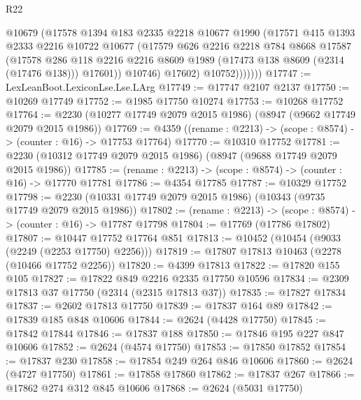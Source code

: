 \begin{lexlean}{R22}
\begin{coremodule}
                  @10679
                  (@17578
                    @1394
                    @183
                    @2335
                    @2218
                    @10677
                    @1990
                    (@17571
                      @415
                      @1393
                      @2333
                      @2216
                      @10722
                      @10677
                      (@17579
                        @626
                        @2216
                        @2218
                        @784
                        @8668
                        @17587
                        (@17578
                          @286
                          @118
                          @2216
                          @2216
                          @8609
                          @1989
                          (@17473 @138 @8609 (@2314 (@17476 @138)))
                          @17601))
                      @10746)
                    @17602)
                  @10752)))))))
@17747 := LexLeanBoot.LexiconLse.Lse.LArg
@17749 := @17747 @2107 @2137
@17750 := @10269 @17749
@17752 := @1985 @17750 @10274
@17753 := @10268 @17752
@17764 := @2230 (@10277 @17749 @2079 @2015 @1986) (@8947 (@9662 @17749 @2079 @2015 @1986))
@17769 := @4359 ((rename : @2213) -> (scope : @8574) -> (counter : @16) -> @17753 @17764)
@17770 := @10310 @17752
@17781 := @2230 (@10312 @17749 @2079 @2015 @1986) (@8947 (@9688 @17749 @2079 @2015 @1986))
@17785 := (rename : @2213) -> (scope : @8574) -> (counter : @16) -> @17770 @17781
@17786 := @4354 @17785
@17787 := @10329 @17752
@17798 := @2230 (@10331 @17749 @2079 @2015 @1986) (@10343 (@9735 @17749 @2079 @2015 @1986))
@17802 := (rename : @2213) -> (scope : @8574) -> (counter : @16) -> @17787 @17798
@17804 := @17769 (@17786 @17802)
@17807 := @10447 @17752 @17764 @851
@17813 := @10452 (@10454 (@9033 (@2249 (@2253 @17750) @2256)))
@17819 := @17807 @17813 @10463 (@2278 (@10466 @17752 @2256))
@17820 := @4399 @17813
@17822 := @17820 @155 @105
@17827 := @17822 @849 @2216 @2335 @17750 @10596
@17834 := @2309 @17813 @37 @17750 (@2314 (@2315 @17813 @37))
@17835 := @17827 @17834
@17837 := @2602 @17813 @17750
@17839 := @17837 @164 @89
@17842 := @17839 @185 @848 @10606
@17844 := @2624 (@4428 @17750)
@17845 := @17842 @17844
@17846 := @17837 @188
@17850 := @17846 @195 @227 @847 @10606
@17852 := @2624 (@4574 @17750)
@17853 := @17850 @17852
@17854 := @17837 @230
@17858 := @17854 @249 @264 @846 @10606
@17860 := @2624 (@4727 @17750)
@17861 := @17858 @17860
@17862 := @17837 @267
@17866 := @17862 @274 @312 @845 @10606
@17868 := @2624 (@5031 @17750)

\end{coremodule}
\end{lexlean}

